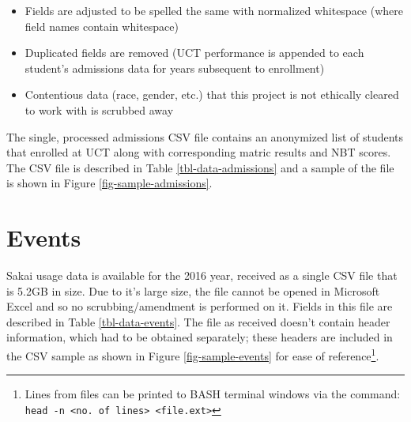 \begin{itemize}
    \item Fields are adjusted to be spelled the same with normalized whitespace (where field names contain whitespace)
    \item Duplicated fields are removed (UCT performance is appended to each student's admissions data for years subsequent to enrollment)
    \item Contentious data (race, gender, etc.) that this project is not ethically cleared to work with is scrubbed away
\end{itemize}

The single, processed admissions CSV file contains an anonymized list of students that enrolled at UCT along with corresponding matric results and NBT scores. The CSV file is described in Table \ref{tbl-data-admissions} and a sample of the file is shown in Figure \ref{fig-sample-admissions}.

\section{Events}
Sakai usage data is available for the 2016 year, received as a single CSV file that is 5.2GB in size. Due to it's large size, the file cannot be opened in Microsoft Excel and so no scrubbing/amendment is performed on it. Fields in this file are described in Table \ref{tbl-data-events}. The file as received doesn't contain header information, which had to be obtained separately; these headers are included in the CSV sample as shown in Figure \ref{fig-sample-events} for ease of reference\footnote{Lines from files can be printed to BASH terminal windows via the command: \texttt{head -n <no. of lines> <file.ext>}}.





